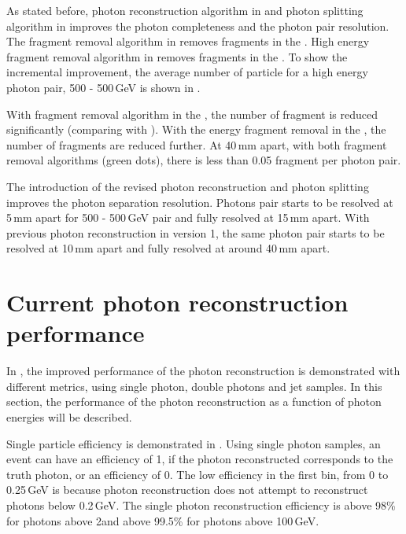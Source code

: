 As stated before, photon reconstruction algorithm in  and photon splitting algorithm in   improves the photon completeness and the photon pair resolution. The fragment removal algorithm in  removes fragments in the \ECAL. High energy fragment removal algorithm in  removes fragments in the \HCAL. To show the incremental improvement, the average number of particle for a high energy photon pair, 500 - 500\,GeV is shown in .

With fragment removal algorithm in the \ECAL, the number of fragment is reduced significantly (comparing with ). With the energy fragment removal in the \HCAL, the number of fragments are reduced further. At 40\,mm apart, with both fragment removal algorithms (green dots), there is less than 0.05 fragment per photon pair.

The introduction of the revised photon reconstruction and photon splitting improves the photon separation resolution. Photons pair starts to be resolved at 5\,mm apart for 500 - 500\,GeV pair and fully resolved at 15\,mm apart. With previous photon reconstruction in \pandora version 1, the same photon pair starts to be resolved at 10\,mm apart and fully resolved at around 40\,mm apart.

\section{Current photon reconstruction performance}

In , the improved performance of the photon reconstruction is demonstrated with different metrics, using single photon, double photons and jet samples. In this section, the performance of the photon reconstruction as a function of photon energies will be described.


Single particle efficiency is demonstrated in . Using single photon samples, an event can have an efficiency of 1, if the photon reconstructed corresponds to the truth photon, or an efficiency of 0. The low efficiency in the first bin, from 0 to 0.25\,GeV is because photon reconstruction does not attempt to reconstruct photons below 0.2\,GeV.  The single photon reconstruction efficiency is above 98\% for photons above 2\GeV and above 99.5\% for photons above 100\,GeV.

